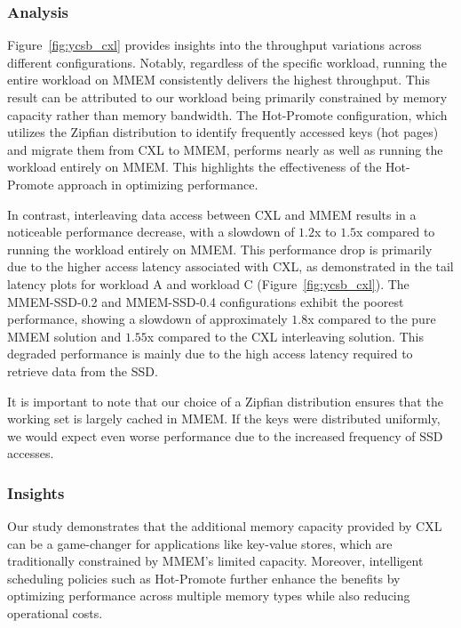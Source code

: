 \subsubsection{Analysis}
Figure~\ref{fig:ycsb_cxl} provides insights into the throughput variations across different configurations. Notably, regardless of the specific workload, running the entire workload on MMEM consistently delivers the highest throughput. This result can be attributed to our workload being primarily constrained by memory capacity rather than memory bandwidth. The Hot-Promote configuration, which utilizes the Zipfian distribution to identify frequently accessed keys (hot pages) and migrate them from CXL to MMEM, performs nearly as well as running the workload entirely on MMEM. This highlights the effectiveness of the Hot-Promote approach in optimizing performance.

In contrast, interleaving data access between CXL and MMEM results in a noticeable performance decrease, with a slowdown of $1.2$x to $1.5$x compared to running the workload entirely on MMEM. This performance drop is primarily due to the higher access latency associated with CXL, as demonstrated in the tail latency plots for workload A and workload C (Figure~\ref{fig:ycsb_cxl}). The MMEM-SSD-0.2 and MMEM-SSD-0.4 configurations exhibit the poorest performance, showing a slowdown of approximately $1.8$x compared to the pure MMEM solution and $1.55$x compared to the CXL interleaving solution. This degraded performance is mainly due to the high access latency required to retrieve data from the SSD.

It is important to note that our choice of a Zipfian distribution ensures that the working set is largely cached in MMEM. If the keys were distributed uniformly, we would expect even worse performance due to the increased frequency of SSD accesses.

\subsubsection{Insights}
Our study demonstrates that the additional memory capacity provided by CXL can be a game-changer for applications like key-value stores, which are traditionally constrained by MMEM’s limited capacity. Moreover, intelligent scheduling policies such as Hot-Promote further enhance the benefits by optimizing performance across multiple memory types while also reducing operational costs.

